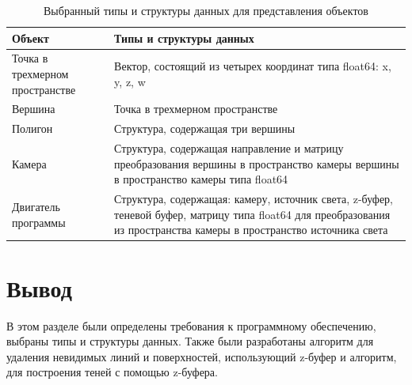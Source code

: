 \begin{table}[!ht]
    \centering
    \caption{\label{tab:object}Выбранный типы и структуры данных для представления объектов}
    \begin{tabular}{|p{6cm}|p{10cm}|}
    \hline
        Объект & Типы и структуры данных \\ \hline
        Точка в трехмерном пространстве & Вектор, состоящий из четырех координат типа float64: x, y, z, w  \\ \hline
        Вершина & Точка в трехмерном пространстве \\ \hline
        Полигон & Структура, содержащая три вершины \\ \hline

        Камера &  Структура, содержащая направление и матрицу преобразования вершины
        в пространство камеры вершины в пространство камеры типа float64 \\ \hline

        Двигатель программы &  Структура, содержащая: камеру,
        источник света, z-буфер, теневой буфер, 
        матрицу типа float64 для преобразования из пространства
        камеры в пространство источника света\\ \hline
    \end{tabular}
\end{table}

\section*{Вывод}
В этом разделе были определены требования к программному обеспечению, выбраны типы и структуры данных. Также были разработаны 
алгоритм для удаления невидимых линий и поверхностей, использующий z-буфер и алгоритм, для построения теней с помощью z-буфера.

